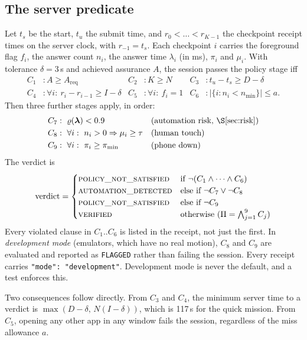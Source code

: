 \documentclass[10pt]{article}
\newcommand{\code}[1]{\texttt{\small #1}}
\begin{document}
\subsection{The server predicate}
Let $t_s$ be the start, $t_u$ the submit time, and $r_0<\dots<r_{K-1}$ the checkpoint receipt times on the server clock,
with $r_{-1}=t_s$. Each checkpoint $i$ carries the foreground flag $f_i$, the answer count $n_i$, the answer time $\lambda_i$
(in ms), $\pi_i$ and $\mu_i$. With tolerance $\delta=3$\,s and achieved assurance $A$, the session passes the policy stage
iff
\begin{align}
C_1&: A\ge A_{\text{req}} &
C_2&: K\ge N &
C_3&: t_u-t_s\ge D-\delta \nonumber\\
C_4&: \forall i:\ r_i-r_{i-1}\ge I-\delta &
C_5&: \forall i:\ f_i=1 &
C_6&: \big|\{i: n_i<n_{\min}\}\big|\le a . \label{eq:pred}
\end{align}
Then three further stages apply, in order:
\begin{align}
C_7&:\ \varrho(\boldsymbol\lambda)<0.9 && \text{(automation risk, \S\ref{sec:risk})}\\
C_8&:\ \forall i:\ n_i>0\Rightarrow \mu_i\ge\tau && \text{(human touch)}\\
C_9&:\ \forall i:\ \pi_i\ge\pi_{\min} && \text{(phone down)}
\end{align}
The verdict is
\[
\text{verdict}=\begin{cases}
\textsc{policy\_not\_satisfied} & \text{if } \neg(C_1\wedge\dots\wedge C_6)\\
\textsc{automation\_detected} & \text{else if } \neg C_7\vee\neg C_8\\
\textsc{policy\_not\_satisfied} & \text{else if } \neg C_9\\
\textsc{verified} & \text{otherwise } (\Pi=\textstyle\bigwedge_{j=1}^{9}C_j)
\end{cases}
\]
Every violated clause in $C_1..C_6$ is listed in the receipt, not just the first. In \emph{development mode} (emulators,
which have no real motion), $C_8$ and $C_9$ are evaluated and reported as \code{FLAGGED} rather than failing the session.
Every receipt carries \code{"mode": "development"}. Development mode is never the default, and a test enforces this.

Two consequences follow directly. From $C_3$ and $C_4$, the minimum server time to a verdict is
$\max(D-\delta,\,N(I-\delta))$, which is 117\,s for the quick mission. From $C_5$, opening any other app in any window
fails the session, regardless of the miss allowance $a$.
\end{document}
